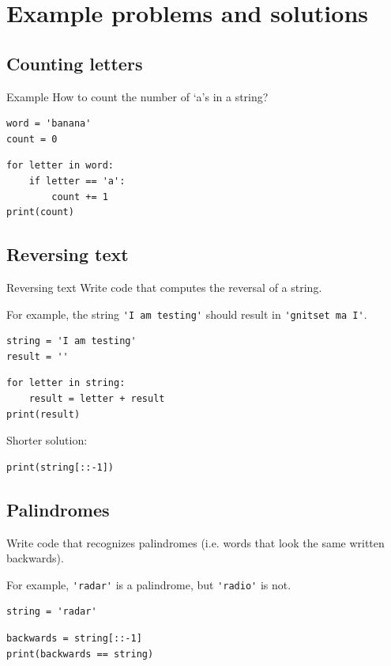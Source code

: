 \documentclass[aspectratio=169,usenames,dvipsnames]{beamer}
\begin{document}
\section{Example problems and solutions}
\subsection{Counting letters}
\frame{\tableofcontents[currentsection]}

\begin{frame}[fragile]{Example}
How to count the number of `a's in a string?
\begin{lstlisting}
word = 'banana'
count = 0
\end{lstlisting}
\pause
\begin{lstlisting}
for letter in word:
    if letter == 'a':
        count += 1
print(count)
\end{lstlisting}
\end{frame}


\subsection{Reversing text}
\begin{frame}[fragile]{Reversing text}
Write code that computes the reversal of a string.

   \vspace{1em}
   For example, the string \lstinline{'I am testing'} should result in
   \lstinline{'gnitset ma I'}.

\begin{lstlisting}
string = 'I am testing'
result = ''
\end{lstlisting}
\pause
\begin{lstlisting}
for letter in string:
    result = letter + result
print(result)
\end{lstlisting}

\pause
Shorter solution:
\begin{lstlisting}
print(string[::-1])
\end{lstlisting}
\end{frame}


\subsection{Palindromes}
\begin{frame}[fragile]
Write code that recognizes palindromes
   (i.e. words that look the same written backwards).

   \vspace{1em}
    For example, \lstinline{'radar'} is a palindrome, but \lstinline{'radio'} is not.

\begin{lstlisting}
string = 'radar'
\end{lstlisting}
\pause
\begin{lstlisting}
backwards = string[::-1]
print(backwards == string)
\end{lstlisting}
\end{frame}
 
\end{document}
